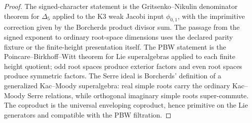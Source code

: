 \begin{proof}
The signed-character statement is the Gritsenko--Nikulin denominator
theorem for $\Delta_5$ applied to the K3 weak Jacobi input
$\phi_{0,1}$, with the imprimitive correction given by the Borcherds
product divisor sum. The passage from the signed exponent to ordinary
root-space dimensions uses the declared parity fixture or the
finite-height presentation itself. The PBW statement is the
Poincare--Birkhoff--Witt theorem for Lie superalgebras applied to each
finite height quotient; odd root spaces produce exterior factors and
even root spaces produce symmetric factors.
The Serre ideal is Borcherds' definition of a generalized Kac--Moody
superalgebra: real simple roots carry the ordinary Kac--Moody Serre
relations, while orthogonal imaginary simple roots super-commute. The
coproduct is the universal enveloping coproduct, hence primitive on the
Lie generators and compatible with the PBW filtration.
\end{proof}

